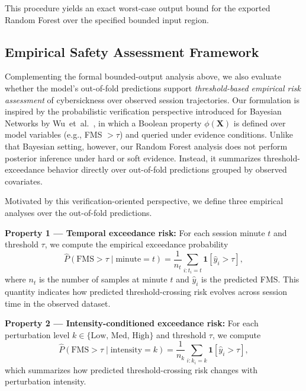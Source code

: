 \documentclass[review]{vgtc}              %
\begin{document}
This procedure yields an exact worst-case output bound for the exported Random Forest over the specified bounded input region.

\subsection{Empirical Safety Assessment Framework}\label{sec:verification}

Complementing the formal bounded-output analysis above, we also evaluate whether the model's out-of-fold predictions support \emph{threshold-based empirical risk assessment} of cybersickness over observed session trajectories. Our formulation is inspired by the probabilistic verification perspective introduced for Bayesian Networks by Wu~et~al.~\cite{Wu2025BN}, in which a Boolean property $\phi(\mathbf{X})$ is defined over model variables (e.g., FMS $> \tau$) and queried under evidence conditions. Unlike that Bayesian setting, however, our Random Forest analysis does not perform posterior inference under hard or soft evidence. Instead, it summarizes threshold-exceedance behavior directly over out-of-fold predictions grouped by observed covariates.

Motivated by this verification-oriented perspective, we define three empirical analyses over the out-of-fold predictions.

\textbf{Property 1 --- Temporal exceedance risk:} For each session minute $t$ and threshold $\tau$, we compute the empirical exceedance probability
\begin{equation}
  \hat{P}(\text{FMS} > \tau \mid \text{minute} = t)
  =
  \frac{1}{n_t}
  \sum_{i: t_i = t}
  \mathbf{1}[\hat{y}_i > \tau],
  \label{eq:temporal}
\end{equation}
where $n_t$ is the number of samples at minute $t$ and $\hat{y}_i$ is the predicted FMS. This quantity indicates how predicted threshold-crossing risk evolves across session time in the observed dataset.

\textbf{Property 2 --- Intensity-conditioned exceedance risk:} For each perturbation level $k \in \{\text{Low, Med, High}\}$ and threshold $\tau$, we compute
\begin{equation}
  \hat{P}(\text{FMS} > \tau \mid \text{intensity} = k)
  =
  \frac{1}{n_k}
  \sum_{i: k_i = k}
  \mathbf{1}[\hat{y}_i > \tau],
  \label{eq:intensity}
\end{equation}
which summarizes how predicted threshold-crossing risk changes with perturbation intensity.
\end{document}
